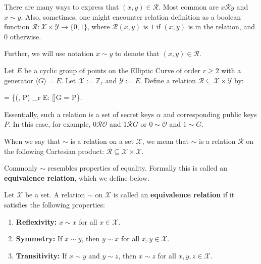 \documentclass[../../book.tex]{subfiles}
\begin{document}
\begin{remark}
    There are many ways to express that $(x,y) \in \mathcal{R}$. Most common are $x \mathcal{R} y$ and $x \sim y$. Also, sometimes, one might encounter relation definition as a boolean function $\mathcal{R}: \mathcal{X} \times \mathcal{Y} \to \{0,1\}$, where $\mathcal{R}(x,y)$ is $1$ if $(x,y)$ is in the relation, and $0$ otherwise.

    Further, we will use notation $x \sim y$ to denote that $(x,y) \in \mathcal{R}$.
\end{remark}

\begin{example}
    Let $E$ be a cyclic group of points on the Elliptic Curve of order $r \geq 2$ with a generator $\langle G \rangle = E$. Let $\mathcal{X} := \mathbb{Z}_r$ and $\mathcal{Y} := E$. Define a relation $\mathcal{R} \subseteq \mathcal{X} \times \mathcal{Y}$ by:
    \begin{xequation*}
         = \{(\alpha, P) \in {}_r \times E: [\alpha]G = P\}.
    \end{xequation*}

    Essentially, such a relation is a set of secret keys $\alpha$ and corresponding public keys $P$. In this case, for example, $0\mathcal{R}\mathcal{O}$ and $1\mathcal{R}G$ or $0 \sim \mathcal{O}$ and $1 \sim G$.
\end{example}

\begin{remark}
    When we say that $\sim$ is a relation on a set $\mathcal{X}$, we mean that $\sim$ is a relation $\mathcal{R}$ on the following Cartesian product: $\mathcal{R} \subseteq \mathcal{X} \times \mathcal{X}$.
\end{remark}

Commonly $\sim$ resembles properties of equality.
Formally this is called an \textbf{equivalence relation}, which we define below.

\begin{definition}
    Let $\mathcal{X}$ be a set. A relation $\sim$ on $\mathcal{X}$ is called an \textbf{equivalence relation} if it satisfies the following properties:
    \begin{enumerate}
        \item \textbf{Reflexivity:} $x \sim x$ for all $x \in \mathcal{X}$.
        \item \textbf{Symmetry:} If $x \sim y$, then $y \sim x$ for all $x,y \in \mathcal{X}$.
        \item \textbf{Transitivity:} If $x \sim y$ and $y \sim z$, then $x \sim z$ for all $x,y,z \in \mathcal{X}$.
    \end{enumerate}
\end{definition}
\end{document}
